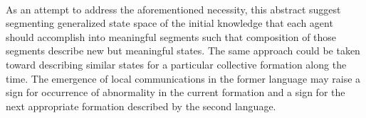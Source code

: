 \documentclass{article}
\begin{document}
	\paragraph{} As an attempt to address the aforementioned necessity, this abstract suggest segmenting generalized state space of the initial knowledge that each agent should accomplish into meaningful segments such that composition of those segments describe new but meaningful states. The same approach could be taken toward describing similar states for a particular collective formation along the time. The emergence of local communications in the former language may raise a sign for occurrence of abnormality in the current formation and a sign for the next appropriate formation described by the second language. 
	
	
\end{document}

